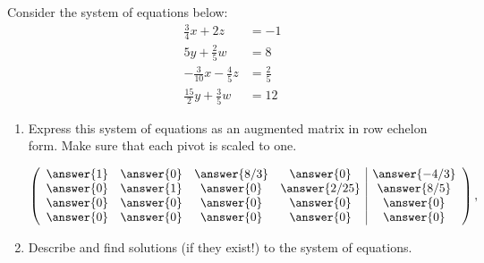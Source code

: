 \documentclass{ximera}
\author{Parisa Fatheddin}
\begin{document}
\begin{exercise} Consider the system of equations below:
\begin{align*}
  \frac{3}{4}x+2z&=-1\\
5y+ \frac{2}{5}w &= 8\\
-\frac{3}{10} x - \frac{4}{5} z &= \frac{2}{5}\\
\frac{15}{2}y + \frac{3}{5}w &= 12
\end{align*}
\begin{enumerate}
\item Express this system of equations as an augmented matrix in row
  echelon form. Make sure that each pivot is scaled to one.
  \begin{prompt}
    \[
    \left(\begin{array}{cccc|c}
        \answer{1} &  \answer{0} & \answer{8/3} & \answer{0} &\answer{-4/3} \\
        \answer{0} &  \answer{1} & \answer{0} & \answer{2/25} &\answer{8/5}\\
        \answer{0} &  \answer{0} & \answer{0} & \answer{0} &\answer{0}\\
        \answer{0} &  \answer{0} & \answer{0} & \answer{0} &\answer{0}
    \end{array}\right),
    \]
  \end{prompt}
\item Describe and find solutions (if they exist!) to the system of equations.
  \begin{prompt}
\begin{selectAll}
\end{selectAll}
  \end{prompt}
\end{enumerate}
\end{exercise}
\end{document}
